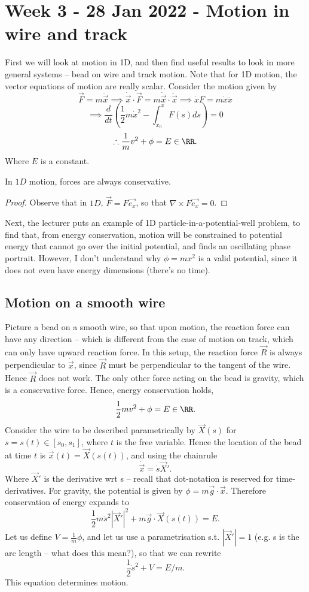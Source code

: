 \section{Week 3 - 28 Jan 2022 - Motion in wire and track}
First we will look at motion in 1D, and then find useful results to look in more
general systems -- bead on wire and track motion.
Note that for 1D motion, the vector equations of motion are really scalar.
Consider the motion given by 
\[\vec{F}=m\ddot{\vec{x}} \implies \dot{\vec{x}}\cdot\vec{F} =
m\dot{\vec{x}}\cdot\ddot{\vec{x}}\implies \dot{x}F=m\dot{x}\ddot{x}\]
\[\implies \frac{d}{dt}\left( \frac{1}{2}m\dot{x}^2 - \int_{x_0}^xF(s)ds
\right)=0\]
\[\therefore \frac{1}{m}v^2 + \phi = E\in\RR.\]
Where $E$ is a constant.
\begin{proposition}
  In $1D$ motion, forces are always conservative.
\end{proposition}
\begin{proof}
Observe that in $1D$, $\vec{F}=F\vec{e_x}$, so that $\nabla \times
F\vec{e_x}=0$.
\end{proof}

Next, the lecturer puts an example of 1D particle-in-a-potential-well problem,
to find that, from energy conservation, motion will be constrained to potential
energy that cannot go over the initial potential, and finds an oscillating phase
portrait. However, I don't understand why $\phi=mx^2$ is a valid potential,
since it does not even have energy dimensions (there's no time).

\subsection{Motion on a smooth wire}
Picture a bead on a smooth wire, so that upon motion, the reaction force can
have any direction -- which is different from the case of motion on track, which
can only have upward reaction force. In this setup, the reaction force $\vec{R}$
is always perpendicular to $\dot{\vec{x}}$, since $\vec{R}$ must be
perpendicular to the tangent of the wire. Hence $\vec{R}$ does not work. The
only other force acting on the bead is gravity, which is a conservative force.
Hence, energy conservation holds,
\[\frac{1}{2}mv^2 + \phi = E\in\RR.\]
Consider the wire to be described parametrically by $\vec{X}(s)$ for
$s=s(t)\in[s_0,s_1]$, where $t$ is the free variable. Hence the location of the
bead at time $t$ is $\vec{x}(t)=\vec{X}(s(t))$, and using the chainrule
\[\dot{\vec{x}} = \dot{s} \vec{X}'.\]
Where $\vec{X}'$ is the derivative wrt s -- recall that dot-notation is reserved
for time-derivatives. For gravity, the potential is given by
$\phi=m\vec{g}\cdot\vec{x}$. Therefore conservation of energy expands to
\[\frac{1}{2}m\dot{s}^2 |\vec{X}'|^2 + m\vec{g}\cdot\vec{X}(s(t)) = E.\]
Let us define $V=\frac{1}{m}\phi$, and let us use a parametrisation s.t.
$|\vec{X}'|=1$ (e.g. s is the arc length -- what does this mean?), so that we
can rewrite
\[\frac{1}{2}\dot{s}^2 + V = E/m.\]
This equation determines motion. 

